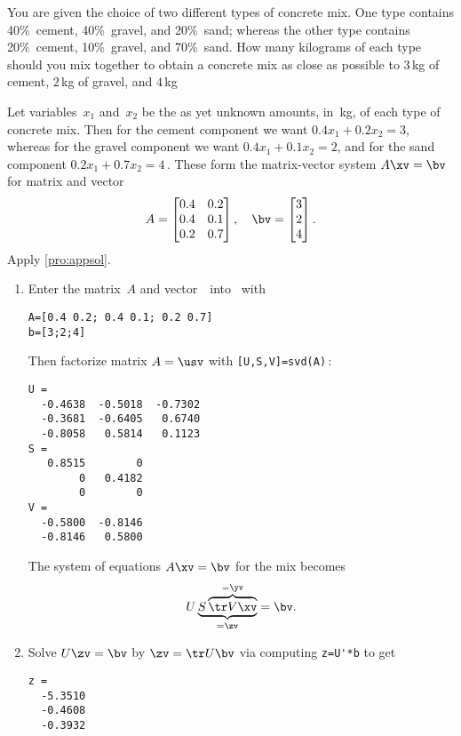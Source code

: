 \begin{example} \label{eg:twotcm} %
You are given the choice of two different types of concrete mix.
One type contains 40\%~cement, 40\%~gravel, and 20\%~sand; whereas the other type contains 20\%~cement, 10\%~gravel, and 70\%~sand.
How many kilograms of each type should you mix together to obtain a concrete mix as close as possible to \(3\)\,kg of cement, \(2\)\,kg of gravel, and \(4\)\,kg 
\begin{solution} 
Let variables~\(x_1\) and~\(x_2\) be the as yet unknown amounts, in~kg, of each type of concrete mix. 
Then for the cement component we want \(0.4x_1+0.2x_2=3\), whereas for the gravel component we want \(0.4x_1+0.1x_2=2\), and for the sand component \(0.2x_1+0.7x_2=4\)\,.
These form the matrix-vector system \(A\xv=\bv\) for matrix and vector
\begin{equation*}
A=\begin{bmatrix} 0.4&0.2\\0.4&0.1\\0.2&0.7 \end{bmatrix},
\quad \bv=\begin{bmatrix} 3\\2\\4 \end{bmatrix}.
\end{equation*}
Apply \cref{pro:appsol}.
\begin{enumerate}
\item Enter the matrix~\(A\) and vector~\bv\ into \script\ with
\setbox\ajrqrbox\hbox{}%
\marginajrbox%
\begin{verbatim}
A=[0.4 0.2; 0.4 0.1; 0.2 0.7]
b=[3;2;4]
\end{verbatim}
Then factorize matrix \(A=\usv\) with \verb|[U,S,V]=svd(A)|\,:
\begin{verbatim}
U =
  -0.4638  -0.5018  -0.7302
  -0.3681  -0.6405   0.6740
  -0.8058   0.5814   0.1123
S =
   0.8515        0
        0   0.4182
        0        0
V =
  -0.5800  -0.8146
  -0.8146   0.5800
\end{verbatim}
The system of equations \(A\xv=\bv\) for the mix becomes
\begin{equation*}
U\underbrace{S\overbrace{\tr V\xv}^{=\yv}}_{=\zv}
=\bv.
\end{equation*}
\item Solve \(U\zv=\bv\) by  \(\zv=\tr U\bv\) via computing \verb|z=U'*b| to get
\begin{verbatim}
z =
  -5.3510
  -0.4608
  -0.3932
\end{verbatim}


\end{enumerate}
\end{solution}
\end{example}
